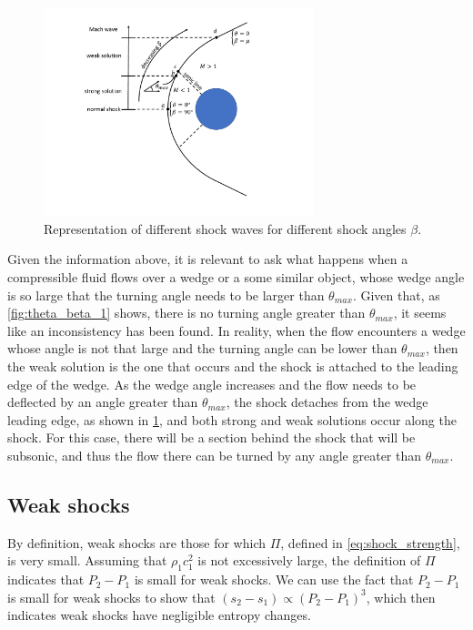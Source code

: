 \documentclass[oneside,a4paper,11pt]{report}
\begin{document}
\begin{figure}[ht]
   \centering
   \includegraphics[width=0.7\textwidth]{../../../images/theta_beta_2.pdf}
   \caption{Representation of different shock waves for different shock angles $\beta$.}
   \label{fig:theta_beta_2}
\end{figure}

Given the information above, it is relevant to ask what happens when a compressible fluid flows over a wedge or a some similar object, whose wedge angle is so large that the turning angle needs to be larger than $\theta_{max}$. Given that, as \cref{fig:theta_beta_1} shows, there is no turning angle greater than $\theta_{max}$, it seems like an inconsistency has been found. In reality, when the flow encounters a wedge whose angle is not that large and the turning angle can be lower than $\theta_{max}$, then the weak solution is the one that occurs and the shock is attached to the leading edge of the wedge. As the wedge angle increases and the flow needs to be deflected by an angle greater than $\theta_{max}$, the shock detaches from the wedge leading edge, as shown in \cref{fig:theta_beta_2}, and both strong and weak solutions occur along the shock. For this case, there will be a section behind the shock that will be subsonic, and thus the flow there can be turned by any angle greater than $\theta_{max}$.

\subsection{Weak shocks}
By definition, weak shocks are those for which $\Pi$, defined in \cref{eq:shock_strength}, is very small. Assuming that $\rho_1 c_1^2$ is not excessively large, the definition of $\Pi$ indicates that $P_2 - P_1$ is small for weak shocks. We can use the fact that $P_2 - P_1$ is small for weak shocks to show that $(s_2 - s_1) \propto (P_2-P_1)^3$, which then indicates weak shocks have negligible entropy changes.
\end{document}

